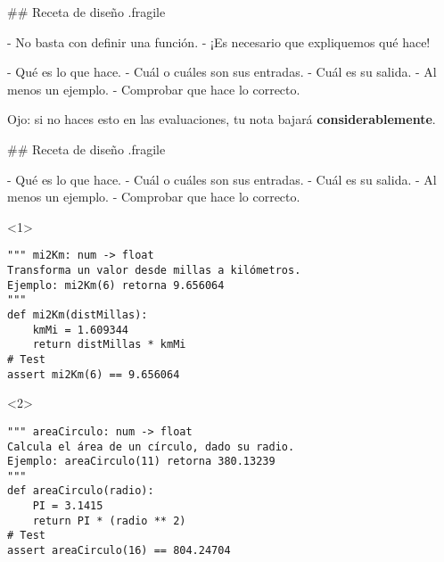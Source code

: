 ## Receta de diseño {.fragile}

- No basta con definir una función.
- ¡Es necesario que expliquemos qué hace!


\vspace{-2ex}

- Qué es lo que hace.
- Cuál o cuáles son sus entradas.
- Cuál es su salida.
- Al menos un ejemplo.
- Comprobar que hace lo correcto.

\vspace{-2ex}

\trmblock


\pause

\bgnblockdanger
Ojo: si no haces esto en las evaluaciones, tu nota bajará \textbf{considerablemente}.
\trmblockdanger

## Receta de diseño {.fragile}

\scriptsize

\vspace{-3ex}

- Qué es lo que hace.
- Cuál o cuáles son sus entradas.
- Cuál es su salida.
- Al menos un ejemplo.
- Comprobar que hace lo correcto.

\vspace{-3ex}
\trmblock


\begin{onlyenv}<1>
\begin{lstlisting}[style=frame01]
""" mi2Km: num -> float
Transforma un valor desde millas a kilómetros.
Ejemplo: mi2Km(6) retorna 9.656064
"""
def mi2Km(distMillas):
    kmMi = 1.609344
    return distMillas * kmMi
# Test
assert mi2Km(6) == 9.656064
\end{lstlisting}
\end{onlyenv}

\begin{onlyenv}<2>
\begin{lstlisting}[style=frame01]
""" areaCirculo: num -> float
Calcula el área de un círculo, dado su radio.
Ejemplo: areaCirculo(11) retorna 380.13239
"""
def areaCirculo(radio):
    PI = 3.1415
    return PI * (radio ** 2)
# Test
assert areaCirculo(16) == 804.24704
\end{lstlisting}
\end{onlyenv}



